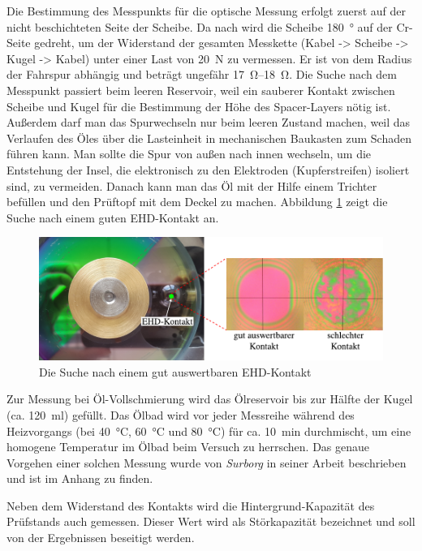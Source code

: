 Die Bestimmung des Messpunkts für die optische Messung erfolgt zuerst auf der nicht beschichteten Seite der Scheibe.
Da nach wird die Scheibe \SI{180}{\degree} auf der Cr-Seite gedreht, um der Widerstand der gesamten Messkette (Kabel -> Scheibe -> Kugel -> Kabel) unter einer Last von \SI{20}{\newton} zu vermessen.
Er ist von dem Radius der Fahrspur abhängig und beträgt ungefähr \SIrange{17}{18}{\ohm}.
Die Suche nach dem Messpunkt passiert beim leeren Reservoir, weil ein sauberer Kontakt zwischen Scheibe und Kugel für die Bestimmung der Höhe des Spacer-Layers nötig ist.
Außerdem darf man das Spurwechseln nur beim leeren Zustand machen, weil das Verlaufen des Öles über die Lasteinheit in mechanischen Baukasten zum Schaden führen kann.
Man sollte die Spur von außen nach innen wechseln, um die Entstehung der Insel, die elektronisch zu den Elektroden (Kupferstreifen) isoliert sind, zu vermeiden.
Danach kann man das Öl mit der Hilfe einem Trichter befüllen und den Prüftopf mit dem Deckel zu machen.
Abbildung \ref{fig:suche_nach_ehd_kontakt} zeigt die Suche nach einem guten EHD-Kontakt an.
\begin{figure}[htb]
    \centering
    \includegraphics[]{./images/suche_nach_ehd_kontakt.pdf}
    \caption{Die Suche nach einem gut auswertbaren EHD-Kontakt}
    \label{fig:suche_nach_ehd_kontakt}
\end{figure}

Zur Messung bei Öl-Vollschmierung wird das Ölreservoir bis zur Hälfte der Kugel (ca. \SI{120}{\ml}) gefüllt.
Das Ölbad wird vor jeder Messreihe während des Heizvorgangs (bei \SI{40}{\degreeCelsius}, \SI{60}{\degreeCelsius} und \SI{80}{\degreeCelsius}) für ca. \SI{10}{\minute} durchmischt, um eine homogene Temperatur im Ölbad beim Versuch zu herrschen.
Das genaue Vorgehen einer solchen Messung wurde von \textit{Surborg} in seiner Arbeit \cite{surborg_2007} beschrieben und ist im Anhang zu finden.

Neben dem Widerstand des Kontakts wird die Hintergrund-Kapazität des Prüfstands auch gemessen.
Dieser Wert wird als Störkapazität bezeichnet und soll von der Ergebnissen beseitigt werden.

